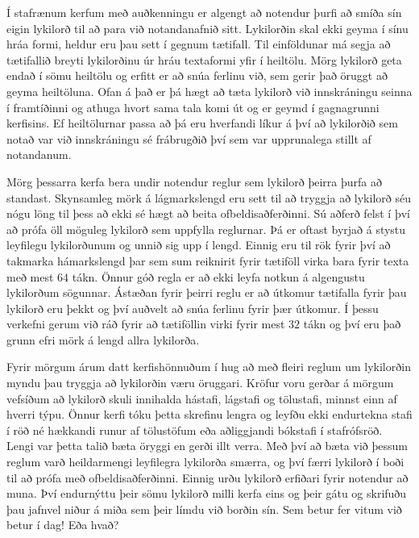 
Í stafrænum kerfum með auðkenningu er algengt að notendur þurfi að smíða sín eigin lykilorð til að para við notandanafnið sitt.
Lykilorðin skal ekki geyma í sínu hráa formi, heldur eru þau sett í gegnum tætifall.
Til einföldunar má segja að tætifallið breyti lykilorðinu úr hráu textaformi yfir í heiltölu.
Mörg lykilorð geta endað í sömu heiltölu og erfitt er að snúa ferlinu við, sem gerir það öruggt að geyma heiltöluna.
Ofan á það er þá hægt að tæta lykilorð við innskráningu seinna í framtíðinni og athuga hvort sama tala komi út og er geymd í gagnagrunni kerfisins.
Ef heiltölurnar passa að þá eru hverfandi líkur á því að lykilorðið sem notað var við innskráningu sé frábrugðið því sem var upprunalega stillt af notandanum.

Mörg þessarra kerfa bera undir notendur reglur sem lykilorð þeirra þurfa að standast.
Skynsamleg mörk á lágmarkslengd eru sett til að tryggja að lykilorð séu nógu löng til þess að ekki sé hægt að beita ofbeldisaðferðinni.
Sú aðferð felst í því að prófa öll möguleg lykilorð sem uppfylla reglurnar.
Þá er oftast byrjað á stystu leyfilegu lykilorðunum og unnið sig upp í lengd.
Einnig eru til rök fyrir því að takmarka hámarkslengd þar sem sum reiknirit fyrir tætiföll virka bara fyrir texta með mest $64$ tákn.
Önnur góð regla er að ekki leyfa notkun á algengustu lykilorðum sögunnar.
Ástæðan fyrir þeirri reglu er að útkomur tætifalla fyrir þau lykilorð eru þekkt og því auðvelt að snúa ferlinu fyrir þær útkomur.
Í þessu verkefni gerum við ráð fyrir að tætiföllin virki fyrir mest $32$ tákn og því eru það grunn efri mörk á lengd allra lykilorða.

Fyrir mörgum árum datt kerfishönnuðum í hug að með fleiri reglum um lykilorðin myndu þau tryggja að lykilorðin væru öruggari.
Kröfur voru gerðar á mörgum vefsíðum að lykilorð skuli innihalda hástafi, lágstafi og tölustafi, minnst einn af hverri týpu.
Önnur kerfi tóku þetta skrefinu lengra og leyfðu ekki endurtekna stafi í röð né hækkandi runur af tölustöfum eða aðliggjandi bókstafi í stafrófsröð.
Lengi var þetta talið bæta öryggi en gerði illt verra.
Með því að bæta við þessum reglum varð heildarmengi leyfilegra lykilorða smærra, og því færri lykilorð í boði til að prófa með ofbeldisaðferðinni.
Einnig urðu lykilorð erfiðari fyrir notendur að muna.
Því endurnýttu þeir sömu lykilorð milli kerfa eins og þeir gátu og skrifuðu þau jafnvel niður á miða sem þeir límdu við borðin sín.
Sem betur fer vitum við betur í dag! Eða hvað?


